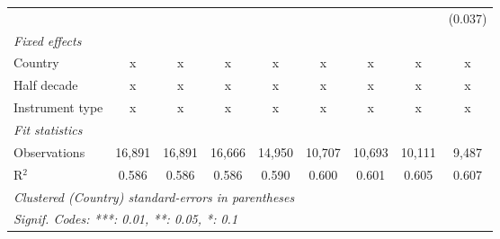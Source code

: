 \begin{tabular}{lcccccccc}
                                                                      &                &                &                &                &                &                &                & (0.037)\\   
   \emph{Fixed effects}\\
   Country                                                            & x              & x              & x              & x              & x              & x              & x              & x\\  
   Half decade                                                        & x              & x              & x              & x              & x              & x              & x              & x\\  
   Instrument type                                                    & x              & x              & x              & x              & x              & x              & x              & x\\  
   \midrule \emph{Fit statistics}\\
   Observations                                                       & 16,891         & 16,891         & 16,666         & 14,950         & 10,707         & 10,693         & 10,111         & 9,487\\  
   R$^2$                                                              & 0.586          & 0.586          & 0.586          & 0.590          & 0.600          & 0.601          & 0.605          & 0.607\\  
   \midrule
   \multicolumn{9}{l}{\emph{Clustered (Country) standard-errors in parentheses}}\\
   \multicolumn{9}{l}{\emph{Signif. Codes: ***: 0.01, **: 0.05, *: 0.1}}\\
\end{tabular}
\par\endgroup


